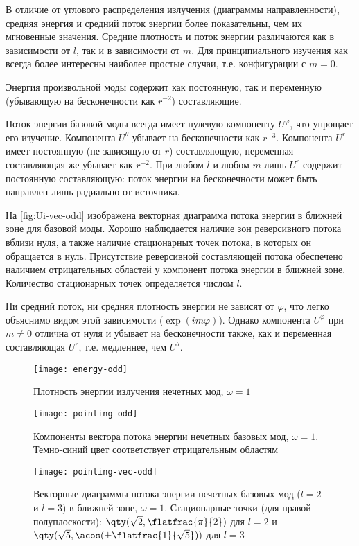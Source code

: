\documentclass[\docroot/reports/draft/report.tex]{subfiles}
\begin{document}
    В отличие от углового распределения излучения (диаграммы направленности), средняя энергия и средний поток энергии более показательны, чем их мгновенные значения. Средние плотность и поток энергии различаются как в зависимости от $l$, так и в зависимости от $m$. Для принципиального изучения как всегда более интересны наиболее простые случаи, т.е. конфигурации с $m=0$.

    Энергия произвольной моды содержит как постоянную, так и переменную (убывающую на бесконечности как $r^{-2}$) составляющие.

    Поток энергии базовой моды всегда имеет нулевую компоненту $U^\varphi$, что упрощает его изучение. Компонента $U^\theta$ убывает на бесконечности как $r^{-3}$. Компонента $U^r$ имеет постоянную (не зависящую от $r$) составляющую, переменная составляющая же убывает как $r^{-2}$. При любом $l$ и любом $m$ лишь $U^r$ содержит постоянную составляющую: поток энергии на бесконечности может быть направлен лишь радиально от источника.

    На \autoref{fig:Ui-vec-odd} изображена векторная диаграмма потока энергии в ближней зоне для базовой моды. Хорошо наблюдается наличие зон реверсивного потока вблизи нуля, а также наличие стационарных точек потока, в которых он обращается в нуль. Присутствие реверсивной составляющей потока обеспечено наличием отрицательных областей у компонент потока энергии в ближней зоне. Количество стационарных точек определяется числом $l$.

    Ни средний поток, ни средняя плотность энергии не зависят от $\varphi$, что легко объяснимо видом этой зависимости ($\exp(i m \varphi)$). Однако компонента $U^\varphi$ при $ m \neq 0$ отлична от нуля и убывает на бесконечности также, как и переменная составляющая $U^r$, т.е. медленнее, чем $U^\theta$.

    \begin{figure}[!htb]%
        \centering\texttt{[image: energy-odd]}%
        \caption[]{Плотность энергии излучения нечетных мод, $\omega = 1$}%
        \label{fig:eps-odd}%
    \end{figure}

    \begin{figure}[!htb]%
        \centering\texttt{[image: pointing-odd]}%
        \caption[]{Компоненты вектора потока энергии нечетных базовых мод, $\omega = 1$. Темно-синий цвет соответствует отрицательным областям}%
        \label{fig:Ui-odd}%
    \end{figure}

    \begin{figure}[!htb]%
        \centering\texttt{[image: pointing-vec-odd]}%
        \caption[]{Векторные диаграммы потока энергии нечетных базовых мод ($l=2$ и $l=3$) в ближней зоне, $\omega = 1$. Стационарные точки (для правой полуплоскости): $\qty(\sqrt{2},\flatfrac{\pi}{2})$ для $l=2$ и $\qty(\sqrt{5},\acos(\pm\flatfrac{1}{\sqrt{5}}))$ для $l=3$}%
        \label{fig:Ui-vec-odd}%
    \end{figure}
\end{document}

